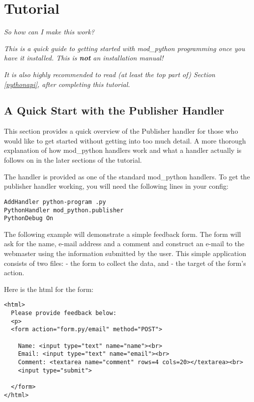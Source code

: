 \chapter{Tutorial\label{tutorial}}

\begin{flushright}
\emph{So how can I make this work?}
\end{flushright}

\emph{This is a quick guide to getting started with mod_python 
programming once you have it installed. This is \textbf{not} an
installation manual!}

\emph{It is also highly recommended to read (at least the top part of)
Section \ref{pythonapi},  after
completing this tutorial.}

\section{A Quick Start with the Publisher Handler\label{tut-pub}}

This section provides a quick overview of the Publisher handler for
those who would like to get started without getting into too much
detail. A more thorough explanation of how mod_python handlers work
and what a handler actually is follows on in the later sections of the
tutorial.

The  handler is provided as one of the standard
mod_python handlers. To get the publisher handler working,
you will need the following lines in your config:

\begin{verbatim}
AddHandler python-program .py
PythonHandler mod_python.publisher
PythonDebug On
\end{verbatim}

The following example will demonstrate a simple feedback form. The
form will ask for the name, e-mail address and a comment and construct
an e-mail to the webmaster using the information submitted by the
user. This simple application consists of two files:
 - the form to collect the data, and
 - the target of the form's action.

Here is the html for the form:

\begin{verbatim}
<html>
  Please provide feedback below:
  <p>                           
  <form action="form.py/email" method="POST">

    Name: <input type="text" name="name"><br>
    Email: <input type="text" name="email"><br>
    Comment: <textarea name="comment" rows=4 cols=20></textarea><br>
    <input type="submit">

  </form>
</html>  
\end{verbatim}

